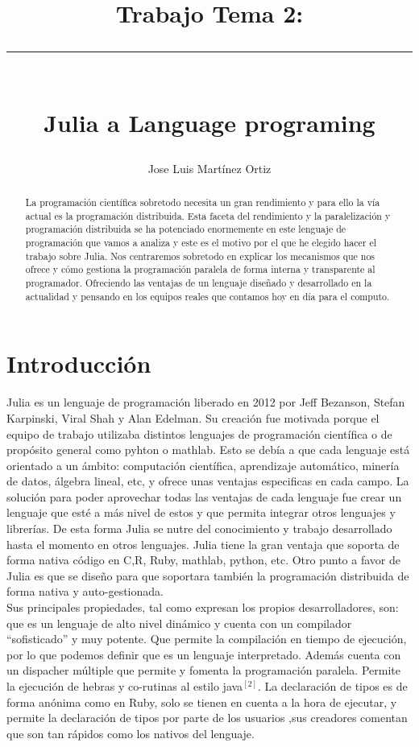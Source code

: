 \documentclass[10pt,a4paper]{article}
\author{Jose Luis Martínez Ortiz}
\title{
\vspace{5cm}
 Trabajo Tema 2:\\
 \noindent\rule{8cm}{0.4pt}
  \\ Julia a Language programing  }
\begin{document}
\maketitle

\newpage

\begin{abstract}
La programación científica sobretodo necesita un gran rendimiento y para ello la vía actual es la programación distribuida. Esta faceta del rendimiento y la paralelización y programación distribuida se ha potenciado enormemente en este lenguaje de programación que vamos a analiza y este es el motivo por el que he elegido hacer el trabajo sobre Julia. Nos centraremos sobretodo en explicar los mecanismos que nos ofrece y cómo gestiona la programación paralela de forma interna y transparente al programador. Ofreciendo las ventajas de un lenguaje diseñado y desarrollado en la actualidad y pensando en los equipos reales que contamos hoy en día para el computo.
\end{abstract}

\section{Introducción}
Julia es un lenguaje de programación liberado en 2012 por Jeff Bezanson, Stefan Karpinski, Viral Shah y Alan Edelman. Su creación fue motivada porque el equipo de trabajo utilizaba distintos lenguajes de programación científica o de propósito general como pyhton o mathlab. Esto se debía a que cada lenguaje está orientado a un ámbito: computación científica, aprendizaje automático, minería de datos, álgebra lineal, etc, y ofrece unas ventajas especificas en cada campo. La solución para poder aprovechar todas las ventajas de cada lenguaje fue crear un lenguaje que esté a más nivel de estos y que permita integrar otros lenguajes y librerías. De esta forma Julia se nutre del conocimiento y trabajo desarrollado hasta el momento en otros lenguajes. Julia tiene la gran ventaja que soporta de forma nativa código en C,R, Ruby, mathlab, python, etc. Otro punto a favor de Julia es que  se diseño para que soportara también la programación distribuida de forma nativa y auto-gestionada.\\

Sus principales propiedades, tal como expresan los propios desarrolladores, son: que es un lenguaje de alto nivel dinámico y cuenta con un compilador ``sofisticado'' y muy potente. Que permite la compilación en tiempo de ejecución, por lo que podemos definir que es un lenguaje interpretado. Además cuenta con un dispacher múltiple que permite y fomenta la programación paralela. Permite la ejecución de hebras y co-rutinas al estilo java$^{[2]}$. La declaración de tipos es de forma anónima como en Ruby, solo se tienen en cuenta a la hora de ejecutar, y permite la declaración de tipos por parte de los usuarios ,sus creadores comentan que son tan rápidos como los nativos del lenguaje.
\end{document}
